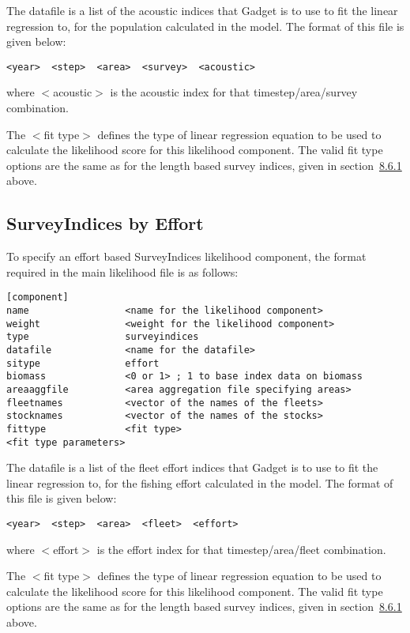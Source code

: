 \documentclass[]{book}
\begin{document}
The datafile is a list of the acoustic indices that Gadget is to use to
fit the linear regression to, for the population calculated in the
model. The format of this file is given below:

\begin{verbatim}
<year>  <step>  <area>  <survey>  <acoustic>
\end{verbatim}

where \(<\)acoustic\(>\) is the acoustic index for that timestep/area/survey
combination.

The \(<\)fit type\(>\) defines the type of linear regression equation to be
used to calculate the likelihood score for this likelihood component.
The valid fit type options are the same as for the length based survey
indices, given in
section~\protect\hyperlink{subsec:sibylength}{8.6.1} above.

\hypertarget{subsec:sibyeffort}{%
\subsection{SurveyIndices by Effort}\label{subsec:sibyeffort}}

To specify an effort based SurveyIndices likelihood component, the
format required in the main likelihood file is as follows:

\begin{verbatim}
[component]
name                 <name for the likelihood component>
weight               <weight for the likelihood component>
type                 surveyindices
datafile             <name for the datafile>
sitype               effort
biomass              <0 or 1> ; 1 to base index data on biomass
areaaggfile          <area aggregation file specifying areas>
fleetnames           <vector of the names of the fleets>
stocknames           <vector of the names of the stocks>
fittype              <fit type>
<fit type parameters>
\end{verbatim}

The datafile is a list of the fleet effort indices that Gadget is to use
to fit the linear regression to, for the fishing effort calculated in
the model. The format of this file is given below:

\begin{verbatim}
<year>  <step>  <area>  <fleet>  <effort>
\end{verbatim}

where \(<\)effort\(>\) is the effort index for that timestep/area/fleet
combination.

The \(<\)fit type\(>\) defines the type of linear regression equation to be
used to calculate the likelihood score for this likelihood component.
The valid fit type options are the same as for the length based survey
indices, given in
section~\protect\hyperlink{subsec:sibylength}{8.6.1} above.
\end{document}

